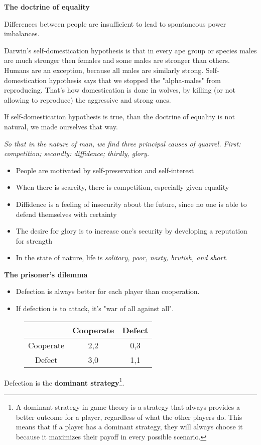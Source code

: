 \textbf{The doctrine of equality}

Differences between people are insufficient to lead to spontaneous power
imbalances.

Darwin's self-domestication hypothesis is that in every ape group or species
males are much stronger then females and some males are stronger than others.
Humans are an exception, because all males are similarly strong.
Self-domestication hypothesis says that we stopped the "alpha-males" from
reproducing. That's how domestication is done in wolves, by killing (or not
allowing to reproduce) the aggressive and strong ones.

If self-domestication hypothesis is true, than the doctrine of equality is
not natural, we made ourselves that way.

\textit{So that in the nature of man, we find three principal causes of
quarrel. First: competition; secondly: diffidence; thirdly, glory.}

\begin{itemize}
    \item People are motivated by self-preservation and self-interest
    \item When there is scarcity, there is competition, especially given
    equality
    \item Diffidence is a feeling of insecurity about the future, since no
    one is able to defend themselves with certainty
    \item The desire for glory is to increase one's security by developing
    a reputation for strength
    \item In the state of nature, life is \textit{solitary, poor, nasty,
    brutish, and short}.
\end{itemize}

\textbf{The prisoner's dilemma}

\begin{itemize}
    \item Defection is always better for each player than cooperation.
    \item If defection is to attack, it's "war of all against all".
\end{itemize}

\begin{figure}[H]
    \centering
    \begin{tabular}{|c|c|c|}
    \hline
    & Cooperate & Defect \\
    \hline
    Cooperate & 2,2 & 0,3 \\
    \hline
    Defect & 3,0 & 1,1 \\
    \hline
\end{tabular}

\end{figure}
Defection is the \textbf{dominant strategy}\footnote{
    A dominant strategy in game theory is a strategy that always provides a
    better outcome for a player, regardless of what the other players do. This
    means that if a player has a dominant strategy, they will always choose it
    because it maximizes their payoff in every possible scenario.
}.

